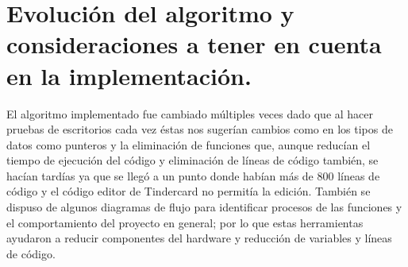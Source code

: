 \documentclass{article}
\begin{document}
\section{Evolución del algoritmo y consideraciones a tener en cuenta en la implementación.
}
El algoritmo implementado fue cambiado múltiples veces dado que al hacer pruebas de escritorios cada vez éstas nos sugerían cambios como en los tipos de datos como punteros y la eliminación de funciones que, aunque reducían el tiempo de ejecución del código y eliminación de líneas de código también, se hacían tardías ya que se llegó a un punto donde habían más de 800 líneas de código y el código editor de Tindercard no permitía la edición. También se dispuso de algunos diagramas de flujo para identificar procesos de las funciones y el comportamiento del proyecto en general; por lo que estas herramientas ayudaron a reducir componentes del hardware y reducción de variables y líneas de código.
\end{document}
